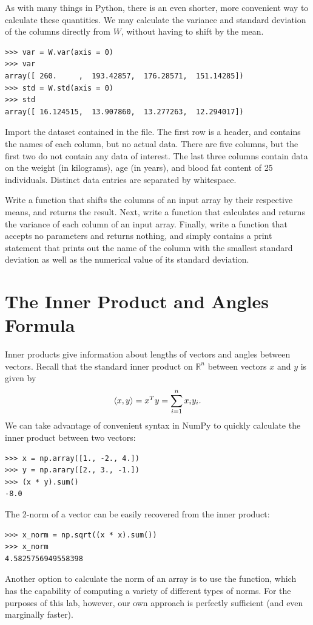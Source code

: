 As with many things in Python, there is an even shorter, more convenient way to calculate these quantities.
We may calculate the variance and standard deviation of the columns directly from $W$, without having to shift
by the mean.

\begin{lstlisting}
>>> var = W.var(axis = 0)
>>> var
array([ 260.     ,  193.42857,  176.28571,  151.14285])
>>> std = W.std(axis = 0)
>>> std
array([ 16.124515,  13.907860,  13.277263,  12.294017])
\end{lstlisting}

\begin{problem}
\label{prob:shiftdata}
Import the dataset contained in the  file. The first row is a header, and contains the names
of each column, but no actual data. There are five columns, but the first two do not contain any data of interest.
The last three columns contain data on the weight (in kilograms), age (in years), and blood fat content of 25
individuals. Distinct data entries are separated by whitespace.

Write a function  that shifts the columns of an input array by their respective means, and returns the result.
Next, write a function  that calculates and returns the variance of each column of an input array.
Finally, write a function  that accepts no parameters and returns nothing, and simply contains a print
statement that prints out the name of the column with the smallest standard deviation as well as the numerical value of
its standard deviation.

\end{problem}

\section*{The Inner Product and Angles Formula}

Inner products give information about lengths of vectors and angles between vectors.
Recall that the standard inner product on $\mathbb{R}^n$ between vectors $x$ and $y$ is given by
$$
\langle x,y \rangle = x^T y = \displaystyle\sum_{i=1}^n x_iy_i.
$$
We can take advantage of convenient syntax in NumPy to quickly calculate the inner product between two vectors:
\begin{lstlisting}
>>> x = np.array([1., -2., 4.])
>>> y = np.arary([2., 3., -1.])
>>> (x * y).sum()
-8.0
\end{lstlisting}
The 2-norm of a vector can be easily recovered from the inner product:
\begin{lstlisting}
>>> x_norm = np.sqrt((x * x).sum())
>>> x_norm
4.5825756949558398
\end{lstlisting}
Another option to calculate the norm of an array is to use the  function, which has the
capability of computing a variety of different types of norms. For the purposes of this lab, however, our own
approach is perfectly sufficient (and even marginally faster).

